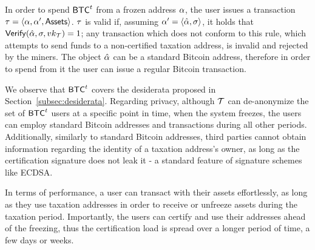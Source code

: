 In order to spend $\mathsf{BTC}^{t}$ from a frozen address $\alpha$, the user issues a
transaction $\tau = \langle \alpha, \alpha', \mathsf{Assets} \rangle$.
$\tau$ is valid if, assuming $\alpha' = \langle \hat{\alpha}, \sigma
\rangle$, it holds that $\mathsf{Verify}(\hat{\alpha}, \sigma, vk_\mathcal{T})
= 1$; any transaction which does not conform to this rule, \ie which attempts
to send funds to a non-certified taxation address, is invalid and rejected by
the miners. The object $\hat{\alpha}$ can be a standard Bitcoin address,
therefore in order to spend from it the user can issue a regular Bitcoin
transaction.

We observe that $\mathsf{BTC}^{t}$ covers the desiderata proposed in
Section~\ref{subsec:desiderata}. Regarding privacy, although $\mathcal{T}$ can
de-anonymize the set of $\mathsf{BTC}^{t}$ users at a specific point in time, \ie when
the system freezes, the users can employ standard Bitcoin addresses and
transactions during all other periods. Additionally, similarly to standard
Bitcoin addresses, third parties cannot obtain information regarding the
identity of a taxation address's owner, as long as the certification signature
does not leak it - a standard feature of signature schemes like ECDSA.

In terms of performance, a user can transact with their assets
effortlessly, as long as they use taxation addresses in order to receive or
unfreeze assets during the taxation period. Importantly, the users can certify
and use their addresses ahead of the freezing, thus the certification load is
spread over a longer period of time, \eg a few days or weeks.
